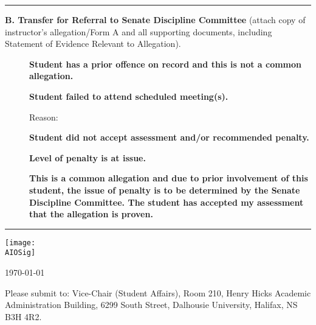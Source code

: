\documentclass[11pt]{article}
\begin{document}
\noindent \rule[0.5em]{\linewidth}{2pt}

\noindent \fbox{\TransferReasonB} {\bf B. Transfer for Referral
	 to Senate Discipline Committee } (attach copy of instructor’s
	 allegation/Form A and all supporting documents, including
	 Statement of Evidence Relevant to Allegation).
\vspace*{1em}

\vspace*{1em}
\begin{description}
\item[\fbox{\TransferReasonPrior}] {\bf Student has a prior offence on 
     record and this is not a common allegation. }

\item[\fbox{\TransferReasonMeeting}] {\bf Student failed to attend scheduled 
     meeting(s).}

     Reason: \ReasonForNotMeeting

\item[\fbox{\TransferReasonAssessment}] {\bf Student did not accept assessment 
      and/or recommended penalty.}

\item[\fbox{\TransferReasonPenalty}] {\bf Level of penalty is at issue.}

\item[\fbox{\TransferReasonCommon}] {\bf This is a common allegation and due 
     to prior involvement of this student, the issue of penalty is
     to be determined by the Senate Discipline Committee. The student
     has accepted my assessment that the allegation is proven.}
\end{description}

\noindent \rule[1em]{\linewidth}{2pt}

           \texttt{[image: \\AIOSig]} 
\vspace*{1em}

 \today
\vspace*{1em}
\vspace*{1em}

Please submit to: Vice-Chair (Student Affairs), Room 210, 
Henry Hicks Academic Administration Building, 6299 South Street, 
Dalhousie University, Halifax, NS B3H 4R2.
\end{document}
